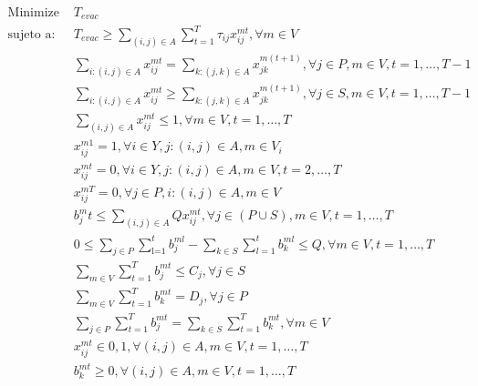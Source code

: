 \documentclass[letter, 10pt]{article}
\begin{document}
\begin{align}
\text{Minimize }& T_{evac}\\
\text{sujeto a: }& T_{evac} \geq  \sum_{(i,j) \in A}  \sum_{t=1}^T \tau_{ij} x_{ij}^{mt}, \forall m \in V\\
&  \sum_{i:(i,j) \in A} x_{ij}^{mt} =  \sum_{k:(j,k)\in A} x_{jk}^{m(t+1)}, \forall j \in P, m \in V, t = 1,\dots,T-1\\
&  \sum_{i:(i,j) \in A} x_{ij}^{mt} \geq  \sum_{k:(j,k)\in A} x_{jk}^{m(t+1)}, \forall j \in S, m \in V, t = 1,\dots,T-1\\
&  \sum_{(i,j) \in A} x_{ij}^{mt} \leq 1, \forall m \in V, t = 1, \dots, T\\
& x_{ij}^{m1} = 1, \forall i \in Y, j:(i,j)\in A, m \in V_i\\
& x_{ij}^{mt} = 0, \forall i \in Y, j:(i,j) \in A, m \in V, t = 2,\dots,T\\
& x_{ij}^{mT} = 0, \forall j \in P, i:(i,j)\in A,m\in V\\
&b_j^mt \leq  \sum_{(i,j)\in A} Q x_{ij}^{mt}, \forall j \in (P \cup S), m \in V , t = 1,\dots,T\\
&0 \leq  \sum_{j \in P}  \sum_{\text{l=1}}^t b_j^{ml} -  \sum_{k \in S}  \sum_{l=1}^t b_k^{ml} \leq Q, \forall m \in V, t = 1, \dots , T\\
&\sum_{m\in V}  \sum_{t = 1}^T b_j^{mt} \leq C_j, \forall j \in S\\
& \sum_{m \in V}  \sum_{t=1}^T b_k^{mt} = D_j, \forall j \in P\\
& \sum_{j\in P}  \sum_{t = 1}^T b_j^{mt} =  \sum_{k\in S}  \sum_{t = 1}^T b_k^{mt}, \forall m \in V\\
&x_{ij}^{mt} \in {0,1}, \forall (i,j) \in A, m\in V, t = 1,\dots,T\\
& b_k^{mt} \geq 0, \forall (i,j) \in A, m \in V, t = 1,\dots,T
\end{align}
\end{document}
